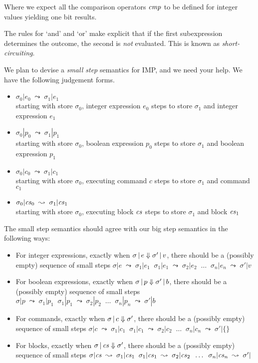 \documentclass{article}
\begin{document}
Where we expect all the comparison operators $\mathit{cmp}$ to be defined for
integer values yielding one bit results.

The rules for `and' and `or' make explicit that if the first
subexpression determines the outcome, the second is \emph{not}
evaluated. This is known as \emph{short-circuiting}.



\newcommand{\ssj}[4]{#1|#2 \;\leadsto\; #3|#4}

We plan to devise a \emph{small step} semantics for IMP, and we need
your help. We have the following judgement forms.

\begin{itemize}
\item $\ssj{\sigma_0}{e_0}{\sigma_1}{e_1}$\\
  starting with store $\sigma_0$, integer expression $e_0$ steps to store $\sigma_1$ and integer expression $e_1$
\item $\ssj{\sigma_0}{p_0}{\sigma_1}{p_1}$\\
  starting with store $\sigma_0$, boolean expression $p_0$ steps to
  store $\sigma_1$ and boolean expression $p_1$
\item $\ssj{\sigma_0}{c_0}{\sigma_1}{c_1}$\\
  starting with store $\sigma_0$, executing command $c$ steps to store
  $\sigma_1$ and command $c_1$
\item $\ssj{\sigma_0}{\cs_0}{\sigma_1}{\cs_1}$\\
  starting with store $\sigma_0$, executing block $\mathit{cs}$ steps to store
  $\sigma_1$ and block $\mathit{cs}_1$
\end{itemize}

The small step semantics should agree with our big step semantics in
the following ways:

\begin{itemize}
  \item For integer expressions, exactly when $\sigma \,|\, e \Downarrow \sigma' \,|\, v$, there should
    be a (possibly empty) sequence of small steps
    $\ssj{\sigma}{e}{\sigma_1}{e_1} \;\;
    \ssj{\sigma_1}{e_1}{\sigma_2}{e_2}\;\;\ldots\;\;
    \ssj{\sigma_n}{e_n}{\sigma'}{v}$
  \item For boolean expressions, exactly when $\sigma \,|\, p \Downarrow \sigma' \,|\, b$, there should
    be a (possibly empty) sequence of small steps
    $\ssj{\sigma}{p}{\sigma_1}{p_1} \;\;
    \ssj{\sigma_1}{p_1}{\sigma_2}{p_2}\;\;\ldots\;\;
    \ssj{\sigma_n}{p_n}{\sigma'}{b}$
  \item For commands, exactly when $\sigma \,|\, c \Downarrow \sigma'$, there should
    be a (possibly empty) sequence of small steps
    $\ssj{\sigma}{c}{\sigma_1}{c_1} \;\;
    \ssj{\sigma_1}{c_1}{\sigma_2}{c_2}\;\;\ldots\;\;
    \ssj{\sigma_n}{c_n}{\sigma'}{\{\}}$
  \item For blocks, exactly when $\sigma \,|\, \mathit{cs} \Downarrow \sigma'$, there should
    be a (possibly empty) sequence of small steps
    $\ssj{\sigma}{\cs}{\sigma_1}{\cs_1} \;\;
    \ssj{\sigma_1}{\cs_1}{\sigma_2}{\cs_2}\;\;\ldots\;\;
    \ssj{\sigma_n}{\cs_n}{\sigma'}{}$
\end{itemize}
\end{document}

